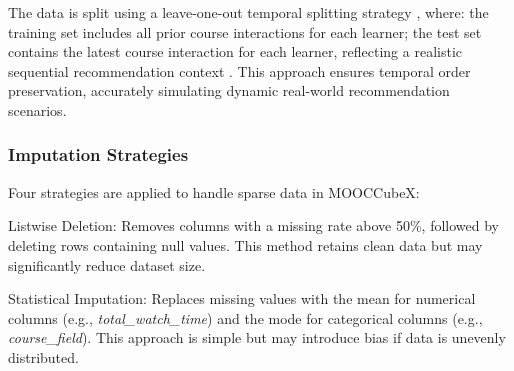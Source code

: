 \documentclass{ieeeaccess}
\begin{document}
\begin{table}[H]
\centering
\caption{Overview of the filtered dataset}
\label{tab:filtered_data_overview}
\renewcommand{\arraystretch}{1.2}
\end{table}

The data is split using a leave-one-out temporal splitting strategy \cite{he2017neural}, where:
the training set includes all prior course interactions for each learner;
the test set contains the latest course interaction for each learner, reflecting a realistic sequential recommendation context \cite{kang2018self_attentive, tang2018personalized}.
This approach ensures temporal order preservation, accurately simulating dynamic real-world recommendation scenarios.

\subsubsection{Imputation Strategies}

Four strategies are applied to handle sparse data in MOOCCubeX:

Listwise Deletion: Removes columns with a missing rate above 50\%, followed by deleting rows containing null values. This method retains clean data but may significantly reduce dataset size.

Statistical Imputation: Replaces missing values with the mean for numerical columns (e.g., \textit{total\_watch\_time}) and the mode for categorical columns (e.g., \textit{course\_field}). This approach is simple but may introduce bias if data is unevenly distributed.
\end{document}

